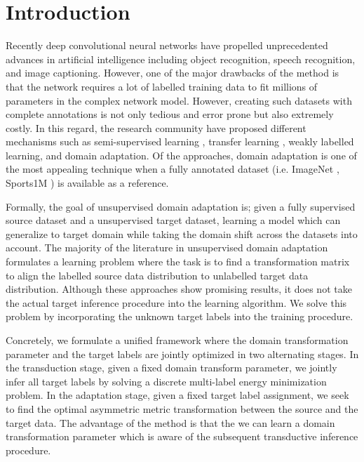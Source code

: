 \documentclass{article}
\begin{document}
\section{Introduction}
\label{intro}
Recently deep convolutional neural networks \cite{alexnet, vggnet, googlenet} have propelled unprecedented advances in artificial intelligence including object recognition, speech recognition, and image captioning. However, one of the major drawbacks of the method is that the network requires a lot of labelled training data to fit millions of parameters in the complex network model. However, creating such datasets with complete annotations is not only tedious and error prone but also extremely costly. In this regard, the research community have proposed different mechanisms such as semi-supervised learning \cite{semisup1,semisup2,semisup3}, transfer learning \cite{transfer1, transfer2}, weakly labelled learning, and domain adaptation. Of the approaches, domain adaptation is one of the most appealing technique when a fully annotated dataset (i.e. ImageNet \cite{ImageNet}, Sports1M \cite{sports1m}) is available as a reference. 

Formally, the goal of unsupervised domain adaptation is; given a fully supervised source dataset and a unsupervised target dataset, learning a model which can generalize to target domain while taking the domain shift across the datasets into account. The majority of the literature \cite{gong12, baochen15, fernando13, baochen16, tommasi13} in unsupervised domain adaptation formulates a learning problem where the task is to find a transformation matrix to align the labelled source data distribution to unlabelled target data distribution. Although these approaches show promising results, it does not take the actual target inference procedure into the learning algorithm. We solve this problem by incorporating the unknown target labels into the training procedure.

Concretely, we formulate a unified framework where the domain transformation parameter and the target labels are jointly optimized in two alternating stages. In the transduction stage, given a fixed domain transform parameter, we jointly infer all target labels by solving a discrete multi-label energy minimization problem. In the adaptation stage, given a fixed target label assignment, we seek to find the optimal asymmetric metric transformation between the source and the target data. The advantage of the method is that the we can learn a domain transformation parameter which is aware of the subsequent transductive inference procedure. 
\end{document}
